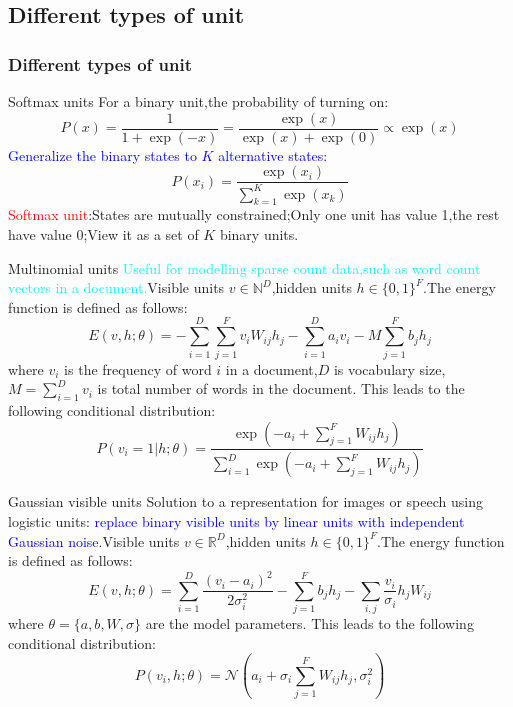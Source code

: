 \documentclass{beamer}
\begin{document}
\begin{CJK*}{UTF8}{gbsn}
\subsection{Different types of unit}
\begin{frame}[allowframebreaks]\frametitle{Different types of unit}
\begin{block}{Softmax units}
For a binary unit,the probability of turning on:
\begin{equation}
P(x)=\frac{1}{1+\exp(-x)}=\frac{\exp(x)}{\exp(x)+\exp(0)}\propto\exp(x)
\end{equation}
\textcolor{blue}{Generalize the binary states to $K$ alternative states:}
\begin{equation}
P(x_i)=\frac{\exp(x_i)}{\sum_{k=1}^K\exp(x_k)}
\end{equation}
\textcolor{red}{Softmax unit}:States are mutually constrained;Only one unit has value 1,the rest have value 0;View it as a set of $K$ binary units.\\
\end{block}

\begin{block}{Multinomial units}
\textcolor{cyan}{Useful for modelling sparse count data,such as word count vectors in a document.}Visible units $v\in \mathbb{N}^D$,hidden units $h\in\{0,1\}^F$.The energy function is defined as follows:
\begin{equation}
E(v,h;\theta)=-\sum_{i=1}^D\sum_{j=1}^Fv_iW_{ij}h_j-\sum_{i=1}^Da_iv_i-M\sum_{j=1}^Fb_jh_j
\end{equation}
where $v_i$ is the frequency of word $i$ in a document,$D$ is vocabulary size,$M=\sum_{i=1}^Dv_i$ is total number of words in the document.
This leads to the following conditional distribution:
\begin{equation}
P(v_i=1|h;\theta)=\frac{\exp(-a_i+\sum_{j=1}^FW_{ij}h_j)}{\sum_{i=1}^D\exp(-a_i+\sum_{j=1}^FW_{ij}h_j)}
\end{equation}
\end{block}

\begin{block}{Gaussian visible units}
Solution to a representation for images or speech using logistic units: \textcolor{blue}{replace binary visible units by linear units with independent Gaussian noise}.Visible units $v\in \mathbb{R}^D$,hidden units $h\in\{0,1\}^F$.The energy function is defined as follows:
\begin{equation}
E(v,h;\theta)=\sum_{i=1}^D\frac{(v_i-a_i)^2}{2\sigma_i^2}-\sum_{j=1}^Fb_jh_j-\sum_{i,j}\frac{v_i}{\sigma_i}h_jW_{ij}
\end{equation}
where $\theta=\{a,b,W,\sigma\}$ are the model parameters.
This leads to the following conditional distribution:
\begin{equation}
P(v_i,h;\theta)=\mathcal{N}(a_i+\sigma_i\sum_{j=1}^FW_{ij}h_j,\sigma_i^2)
\end{equation}
\end{block}


\end{frame}
\end{CJK*}
\end{document}
